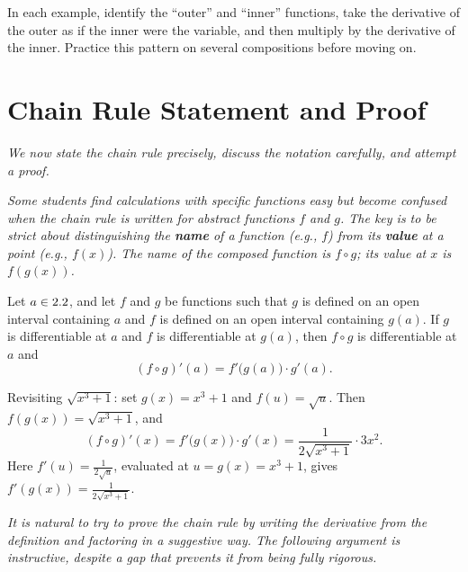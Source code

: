 \begin{remark}
In each example, identify the ``outer'' and ``inner'' functions, take the derivative of the outer as if the inner were the variable, and then multiply by the derivative of the inner.  Practice this pattern on several compositions before moving on.
\end{remark}

\section{Chain Rule Statement and Proof}
\label{sec:3.11}

\textit{We now state the chain rule precisely, discuss the notation carefully, and attempt a proof.}

\textit{Some students find calculations with specific functions easy but become confused when the chain rule is written for abstract functions $f$ and $g$.  The key is to be strict about distinguishing the \textbf{name} of a function (e.g., $f$) from its \textbf{value} at a point (e.g., $f(x)$).  The name of the composed function is $f \circ g$; its value at $x$ is $f(g(x))$.}

\begin{theorem}
\label{thm:3-5}
Let $a \in 2.2$, and let $f$ and $g$ be functions such that $g$ is defined on an open interval containing $a$ and $f$ is defined on an open interval containing $g(a)$.  If $g$ is differentiable at $a$ and $f$ is differentiable at $g(a)$, then $f \circ g$ is differentiable at $a$ and
\[
  (f \circ g)'(a) = f'\!\bigl(g(a)\bigr) \cdot g'(a).
\]
\end{theorem}

\begin{example}
\label{ex:3-12}
Revisiting $\sqrt{x^{3}+1}$: set $g(x) = x^{3}+1$ and $f(u) = \sqrt{u}$.  Then $f(g(x)) = \sqrt{x^{3}+1}$, and
\[
  (f \circ g)'(x) = f'\!\bigl(g(x)\bigr) \cdot g'(x) = \dfrac{1}{2\sqrt{x^{3}+1}} \cdot 3x^{2}.
\]
Here $f'(u) = \frac{1}{2\sqrt{u}}$, evaluated at $u = g(x) = x^{3}+1$, gives $f'(g(x)) = \frac{1}{2\sqrt{x^{3}+1}}$.
\end{example}

\textit{It is natural to try to prove the chain rule by writing the derivative from the definition and factoring in a suggestive way.  The following argument is instructive, despite a gap that prevents it from being fully rigorous.}


